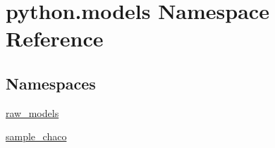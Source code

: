 \hypertarget{namespacepython_1_1models}{\section{python.\-models Namespace Reference}
\label{namespacepython_1_1models}
}
\subsection*{Namespaces}
\begin{DoxyCompactItemize}
\item 
\hyperlink{namespacepython_1_1models_1_1raw__models}{raw\-\_\-models}
\item 
\hyperlink{namespacepython_1_1models_1_1sample__chaco}{sample\-\_\-chaco}
\end{DoxyCompactItemize}
